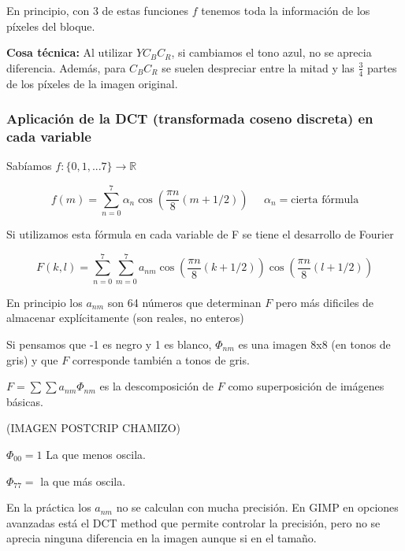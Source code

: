 		En principio, con 3 de estas funciones $f$ tenemos toda la información de los píxeles del bloque.

		\textbf{Cosa técnica:} Al utilizar $Y C_B C_R$, si cambiamos el tono azul, no se aprecia diferencia. Además, para $C_B C_R$ se suelen despreciar entre la mitad y las $\frac{3}{4}$ partes de los píxeles de la imagen original.


		\subsubsection{Aplicación de la DCT (transformada coseno discreta) en cada variable}

			Sabíamos $f: \{ 0,1,...7 \} \rightarrow \mathbb{R}$

			$$ f(m) = \sum\limits^{7}_{n=0} \alpha_n \cos \left(\frac{\pi n}{8} (m + 1/2) \right) \;\;\;\;\; \alpha_n = \text{cierta fórmula} $$

			Si utilizamos esta fórmula en cada variable de F se tiene el desarrollo de Fourier

			$$ F(k,l) = \sum\limits^{7}_{n = 0} \sum\limits^{7}_{m = 0} a_{nm} \cos \left( \frac{\pi n}{8} (k+1/2)  \right) \cos \left( \frac{\pi n}{8} (l+1/2)  \right) $$


			En principio los $a_{nm}$ son 64 números que determinan $F$ pero más dificiles de almacenar explícitamente (son reales, no enteros)

			\begin{framed}
				\vspace{-1.5em}
				\begin{example}

					Si pensamos que -1 es negro y 1 es blanco, $\Phi_{nm}$ es una imagen 8x8 (en tonos de gris) y que $F$ corresponde también a tonos de gris.

					$F = \sum \sum a_{nm} \Phi_{nm}$ es la descomposición de $F$ como superposición de imágenes básicas.

					(IMAGEN POSTCRIP CHAMIZO)

					$\Phi_{00} = 1 $ La que menos oscila.

					$\Phi_{77} = $ la que más oscila.


					\begin{obs} En la práctica los $a_{nm}$ no se calculan con mucha precisión. En GIMP en opciones avanzadas está el DCT method que permite controlar la precisión, pero no se aprecia ninguna diferencia en la imagen aunque si en el tamaño.
					\end{obs}

				\end{example}
			\end{framed}


